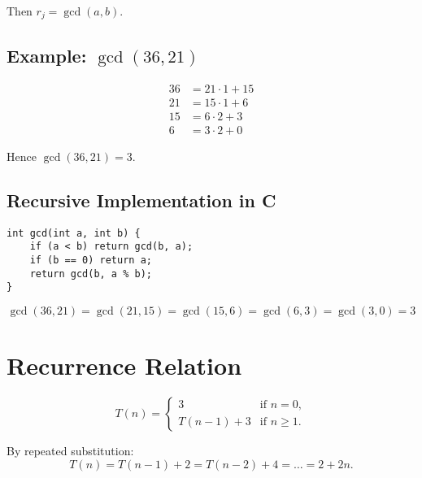 \documentclass[hidelinks]{article}
\theoremstyle{mystyle}
\begin{document}
Then $r_j = \gcd(a, b)$.

\subsection{Example: $\gcd(36, 21)$}
\begin{align*}
36 &= 21 \cdot 1 + 15 \\
21 &= 15 \cdot 1 + 6 \\
15 &= 6 \cdot 2 + 3 \\
6  &= 3 \cdot 2 + 0
\end{align*}

Hence $\gcd(36, 21) = 3$.

\subsection{Recursive Implementation in C}
\begin{verbatim}
int gcd(int a, int b) {
    if (a < b) return gcd(b, a);
    if (b == 0) return a;
    return gcd(b, a % b);
}
\end{verbatim}

\[
\gcd(36, 21) = \gcd(21, 15) = \gcd(15, 6) = \gcd(6, 3) = \gcd(3, 0) = 3
\]

\section{Recurrence Relation}

\[
T(n) =
\begin{cases}
  3 & \text{if } n = 0, \\
  T(n-1) + 3 & \text{if } n \geq 1.
\end{cases}
\]

By repeated substitution:
\[
T(n) = T(n-1) + 2 = T(n-2) + 4 = \dots = 2 + 2n.
\]
\end{document}
